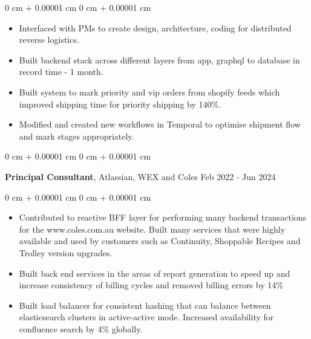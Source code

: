 \documentclass[10pt, letterpaper]{article}
\newenvironment{highlights}{
    \begin{itemize}[
        topsep=0.10 cm,
        parsep=0.10 cm,
        partopsep=0pt,
        itemsep=0pt,
        leftmargin=0 cm + 10pt
    ]
}{
    \end{itemize}
} %
\newenvironment{onecolentry}{
    \begin{adjustwidth}{
        0 cm + 0.00001 cm
    }{
        0 cm + 0.00001 cm
    }
}{
    \end{adjustwidth}
} %
\newenvironment{twocolentry}[2][]{
    \onecolentry
    \def\secondColumn{#2}
    \setcolumnwidth{\fill, 4.5 cm}
    \begin{paracol}{2}
}{
    \switchcolumn \raggedleft \secondColumn
    \end{paracol}
    \endonecolentry
} %
\begin{document}
        \vspace{0.10 cm}
        \begin{onecolentry}
            \begin{highlights}
                \item Interfaced with PMs to create design, architecture, coding for distributed reverse logistics.
                \item Built backend stack across different layers from app, graphql to database in record time - 1 month.
                \item Built system to mark priority and vip orders from shopify feeds which improved shipping time for priority shipping by 140\%.
                \item Modified and created new workflows in Temporal to optimise shipment flow and mark stages appropriately.
            \end{highlights}
        \end{onecolentry}
        
        \vspace{0.15 cm}
        
        \begin{twocolentry}{
            Feb 2022 - Jun 2024
        }
        \textbf{Principal Consultant}, Atlassian, WEX and Coles\end{twocolentry}

        \vspace{0.10 cm}
        \begin{onecolentry}
            \begin{highlights}
                \item Contributed to reactive BFF layer for performing many backend transactions for the www.coles.com.au website. Built many services that were highly available and used by customers such as Continuity, Shoppable Recipes and Trolley version upgrades.
                \item Built back end services in the areas of report generation to speed up and increase consistency of billing cycles and removed billing errors by 14\%
                \item Built load balancer for consistent hashing that can balance between elasticsearch clusters in active-active mode. Increased availability for confluence search by 4\% globally.
            \end{highlights}
        \end{onecolentry}

        \vspace{0.15 cm}
\end{document}
